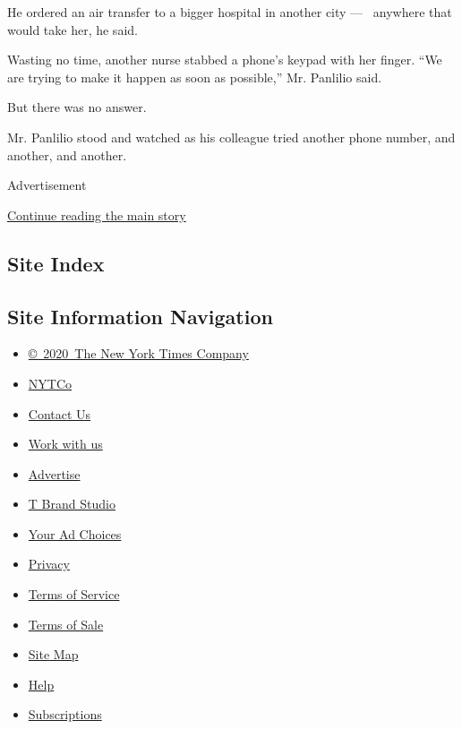 He ordered an air transfer to a bigger hospital in another city ---~
anywhere that would take her, he said.

Wasting no time, another nurse stabbed a phone's keypad with her finger.
``We are trying to make it happen as soon as possible,'' Mr. Panlilio
said.

But there was no answer.

Mr. Panlilio stood and watched as his colleague tried another phone
number, and another, and another.

Advertisement

\protect\hyperlink{after-bottom}{Continue reading the main story}

\hypertarget{site-index}{%
\subsection{Site Index}\label{site-index}}

\hypertarget{site-information-navigation}{%
\subsection{Site Information
Navigation}\label{site-information-navigation}}

\begin{itemize}
\tightlist
\item
  \href{https://help.nytimes.com/hc/en-us/articles/115014792127-Copyright-notice}{©~2020~The
  New York Times Company}
\end{itemize}

\begin{itemize}
\tightlist
\item
  \href{https://www.nytco.com/}{NYTCo}
\item
  \href{https://help.nytimes.com/hc/en-us/articles/115015385887-Contact-Us}{Contact
  Us}
\item
  \href{https://www.nytco.com/careers/}{Work with us}
\item
  \href{https://nytmediakit.com/}{Advertise}
\item
  \href{http://www.tbrandstudio.com/}{T Brand Studio}
\item
  \href{https://www.nytimes.com/privacy/cookie-policy\#how-do-i-manage-trackers}{Your
  Ad Choices}
\item
  \href{https://www.nytimes.com/privacy}{Privacy}
\item
  \href{https://help.nytimes.com/hc/en-us/articles/115014893428-Terms-of-service}{Terms
  of Service}
\item
  \href{https://help.nytimes.com/hc/en-us/articles/115014893968-Terms-of-sale}{Terms
  of Sale}
\item
  \href{https://spiderbites.nytimes.com}{Site Map}
\item
  \href{https://help.nytimes.com/hc/en-us}{Help}
\item
  \href{https://www.nytimes.com/subscription?campaignId=37WXW}{Subscriptions}
\end{itemize}
